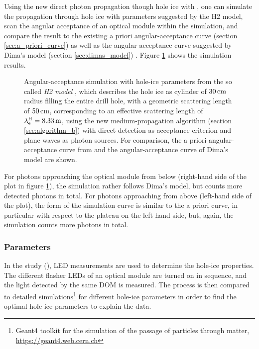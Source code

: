 Using the new direct photon propagation though hole ice with \clsim, one
can simulate the propagation through hole ice with parameters suggested
by the H2 model, scan the angular acceptance of an optical module within
the simulation, and compare the result to the existing a priori
angular-acceptance curve (section \ref{sec:a_priori_curve})
\cite{icepaper} as well as the angular-acceptance curve suggested by
Dima's model (section \ref{sec:dimas_model})
\cite{flasherdataderivedicemodels}. Figure \ref{fig:xaeg2Mee} shows the
simulation results.


\begin{figure}[htbp]
  \caption{Angular-acceptance simulation with hole-ice parameters from the so called \textit{H2 model} \cite{holeicestudieswithyag}, which describes the hole ice as cylinder of $30\text{\,cm}$ radius filling the entire drill hole, with a geometric scattering length of $50\text{\,cm}$, corresponding to an effective scattering length of $\lambda^\text{H}_\text{e} = 8.33\text{\,m}$, using the new medium-propagation algorithm (section \ref{sec:algorithm_b}) with direct detection as acceptance criterion and plane waves as photon sources. For comparison, the a priori angular-acceptance curve from \cite{icepaper} and the angular-acceptance curve of Dima's model \cite{flasherdataderivedicemodels} are shown.}
  \label{fig:xaeg2Mee}
\end{figure}

For photons approaching the optical module from below (right-hand side
of the plot in figure \ref{fig:xaeg2Mee}), the simulation rather follows
Dima's model, but counts more detected photons in total. For photons
approaching from above (left-hand side of the plot), the form of the
simulation curve is similar to the a priori curve, in particular with
respect to the plateau on the left hand side, but, again, the simulation
counts more photons in total.

\subsubsection{ Parameters}
\label{sec:dard_parameters}

In the  study (),
LED measurements are used to determine the hole-ice properties. The
different flasher LEDs of an optical module are turned on in sequence,
and the light detected by the same DOM is measured. The process is then
compared to detailed 
simulations\footnote{Geant4 toolkit for the simulation of the passage of particles through matter, \url{https://geant4.web.cern.ch}}
for different hole-ice parameters in order to find the optimal hole-ice
parameters to explain the data.
\cite{martindardupdate, martinspicehddard}

